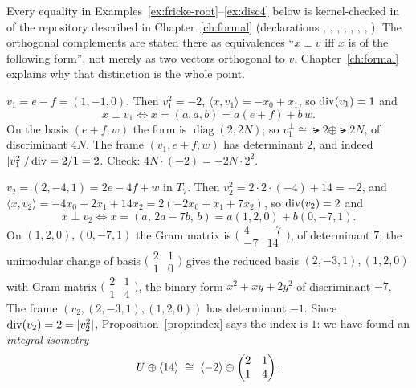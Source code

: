 \begin{leanbox}
Every equality in Examples~\ref{ex:fricke-root}--\ref{ex:disc4} below is
kernel-checked in  of the
repository described in Chapter~\ref{ch:formal} (declarations
, , ,
, ,
, ,
). The orthogonal complements are stated
there as equivalences ``$x\perp v$ iff $x$ is of the following form'', not
merely as two vectors orthogonal to $v$. Chapter~\ref{ch:formal} explains why
that distinction is the whole point.
\end{leanbox}

\begin{example}\label{ex:fricke-root}
$v_1=e-f=(1,-1,0)$. Then $v_1^2=-2$, $\langle x,v_1\rangle=-x_0+x_1$, so
$\operatorname{div}(v_1)=1$ and
\[
  x\perp v_1 \iff x=(a,a,b)=a(e+f)+b\,w .
\]
On the basis $(e+f,w)$ the form is $\operatorname{diag}(2,2N)$; so
$v_1^{\perp}\cong\lat2\oplus\lat{2N}$, of discriminant $4N$. The frame
$(v_1,e+f,w)$ has determinant $2$, and indeed $|v_1^2|/\operatorname{div}=2/1=2$. Check:
$4N\cdot(-2)=-2N\cdot 2^2$.
\end{example}

\begin{example}\label{ex:root7}
$v_2=(2,-4,1)=2e-4f+w$ in $T_7$. Then $v_2^2=2\cdot2\cdot(-4)+14=-2$, and
$\langle x,v_2\rangle=-4x_0+2x_1+14x_2=2(-2x_0+x_1+7x_2)$, so $\operatorname{div}(v_2)=2$
and
\[
  x\perp v_2\iff x=(a,\,2a-7b,\,b)=a(1,2,0)+b(0,-7,1).
\]
On $(1,2,0),(0,-7,1)$ the Gram matrix is
$\bigl(\begin{smallmatrix}4&-7\\-7&14\end{smallmatrix}\bigr)$, of
determinant $7$; the unimodular change of basis
$\bigl(\begin{smallmatrix}2&1\\1&0\end{smallmatrix}\bigr)$ gives the reduced
basis $(2,-3,1),(1,2,0)$ with Gram matrix
$\bigl(\begin{smallmatrix}2&1\\1&4\end{smallmatrix}\bigr)$, the binary form
$x^2+xy+2y^2$ of discriminant $-7$. The frame $(v_2,(2,-3,1),(1,2,0))$ has
determinant $-1$. Since $\operatorname{div}(v_2)=2=|v_2^2|$, Proposition~\ref{prop:index}
says the index is $1$: we have found an \emph{integral isometry}
\[
  U\oplus\langle 14\rangle\;\cong\;\langle -2\rangle\oplus\begin{pmatrix}2&1\\1&4\end{pmatrix}.
\]
\end{example}

